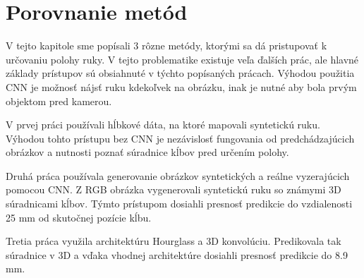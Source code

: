 \section{Porovnanie metód}
V tejto kapitole sme popísali 3 rôzne metódy, ktorými sa dá pristupovať k určovaniu polohy ruky. V tejto problematike existuje veľa ďalších prác, ale hlavné základy prístupov sú obsiahnuté v týchto popísaných prácach. Výhodou použitia CNN je možnosť nájsť ruku kdekoľvek na obrázku, inak je nutné aby bola prvým objektom pred kamerou.

V prvej práci používali hĺbkové dáta, na ktoré mapovali syntetickú ruku. Výhodou tohto prístupu bez CNN je nezávislosť fungovania od predchádzajúcich obrázkov a nutnosti poznať súradnice kĺbov pred určením polohy.

Druhá práca používala generovanie obrázkov syntetických a reálne vyzerajúcich pomocou CNN. Z RGB obrázka vygenerovali syntetickú ruku so známymi 3D súradnicami kĺbov. Týmto prístupom dosiahli presnosť predikcie do vzdialenosti 25 mm od skutočnej pozície kĺbu.

Tretia práca využila architektúru Hourglass a 3D konvolúciu. Predikovala tak súradnice v 3D a vďaka vhodnej architektúre dosiahli presnosť predikcie do 8.9 mm.